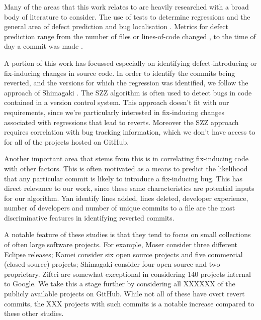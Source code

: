 \documentclass[10pt,journal,compsoc]{IEEEtran}
\begin{document}
Many of the areas that this work relates to are heavily researched with a broad body of literature to consider. The use of tests to determine regressions \cite{} and the general area of defect prediction and bug localisation \cite{kamei2013, shimagaki2016, yan2019}. Metrics for defect prediction range from the number of files or lines-of-code changed \cite{moser2008}, to the time of day a commit was made \cite{eyolfson2011}.

A portion of this work has focussed especially on identifying defect-introducing or fix-inducing changes in source code. In order to identify the commits being reverted, and the versions for which the regression was identified, we follow the approach of Shimagaki \etal \cite{shimagaki2016}. The SZZ algorithm \cite{sliwerski2005} is often used to detect bugs in code contained in a version control system. This approach doesn't fit with our requirements, since we're particularly interested in fix-inducing changes associated with regressions that lead to reverts. Moreover the SZZ approach requires correlation with bug tracking information, which we don't have access to for all of the projects hosted on GitHub.

Another important area that stems from this is in correlating fix-inducing code with other factors. This is often motivated as a means to predict the likelihood that any particular commit is likely to introduce a fix-inducing bug. This has direct relevance to our work, since these same characteristics are potential inputs for our algorithm. Yan \etal \cite{yan2019} identify lines added, lines deleted, developer experience, number of developers and number of unique commits to a file are the most discriminative features in identifying reverted commits.

A notable feature of these studies is that they tend to focus on small collections of often large software projects. For example, Moser \etal \cite{moser2008} consider three different Eclipse releases; Kamei \etal \cite{kamei2013} consider six open source projects and five commercial (closed-source) projects; Shimagaki \etal \cite{shimagaki2016} consider four open source and two proprietary. Ziftci \etal \cite{ziftci2013, ziftci2017} are somewhat exceptional in considering 140 projects internal to Google. We take this a stage further by considering all XXXXXX of the publicly available projects on GitHub. While not all of these have overt revert commits, the XXX projects with such commits is a notable increase compared to these other studies.
\end{document}
